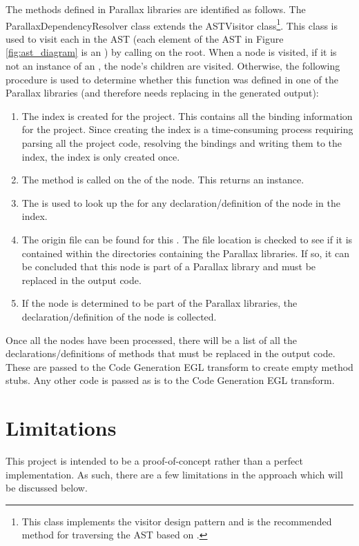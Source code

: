 \documentclass{UoYCSproject}
\begin{document}
The methods defined in Parallax libraries are identified as follows. The ParallaxDependencyResolver class extends the ASTVisitor class\footnote{This class implements the visitor design pattern and is the recommended method for traversing the AST based on \parencite{cdt_parsing}.}.  This class is used to visit each  in the AST (each element of the AST in Figure \ref{fig:ast_diagram} is an ) by calling  on the root. When a node is visited, if it is not an instance of an , the node's children are visited. Otherwise, the following procedure is used to determine whether this function was defined in one of the Parallax libraries (and therefore needs replacing in the generated output):
\begin{enumerate}
\item The index is created for the project. This contains all the binding information for the project. Since creating the index is a time-consuming process requiring parsing all the project code, resolving the bindings and writing them to the index, the index is only created once.
\item The  method is called on the  of the node. This returns an  instance.
\item The  is used to look up the  for any declaration/definition of the node in the index.
\item The origin file can be found for this . The file location is checked to see if it is contained within the directories containing the Parallax libraries. If so, it can be concluded that this node is part of a Parallax library and must be replaced in the output code.
\item If the node is determined to be part of the Parallax libraries, the declaration/definition of the node is collected.
\end{enumerate}

Once all the nodes have been processed, there will be a list of all the declarations/definitions of methods that must be replaced in the output code. These are passed to the Code Generation EGL transform to create empty method stubs. Any other code is passed as is to the Code Generation EGL transform.

\section{Limitations}
This project is intended to be a proof-of-concept rather than a perfect implementation. As such, there are a few limitations in the approach which will be discussed below.
\end{document}

